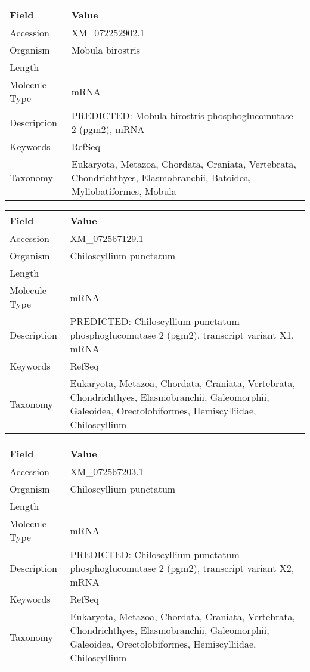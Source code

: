 \documentclass[10pt]{article}
\begin{document}
{\footnotesize
\begin{longtable}{>{\raggedright\arraybackslash}p{4.5cm} >{\raggedright\arraybackslash}p{11.5cm}}
\textbf{Field} & \textbf{Value} \\
\hline
Accession & XM\_072252902.1 \\
Organism & Mobula birostris \\
Length & 4020 \\
Molecule Type & mRNA \\
Description & PREDICTED: Mobula birostris phosphoglucomutase 2 (pgm2), mRNA \\
Keywords & RefSeq \\
Taxonomy & Eukaryota, Metazoa, Chordata, Craniata, Vertebrata, Chondrichthyes, Elasmobranchii, Batoidea, Myliobatiformes, Mobula \\
\end{longtable}
}

{\footnotesize
\begin{longtable}{>{\raggedright\arraybackslash}p{4.5cm} >{\raggedright\arraybackslash}p{11.5cm}}
\textbf{Field} & \textbf{Value} \\
\hline
Accession & XM\_072567129.1 \\
Organism & Chiloscyllium punctatum \\
Length & 2717 \\
Molecule Type & mRNA \\
Description & PREDICTED: Chiloscyllium punctatum phosphoglucomutase 2 (pgm2), transcript variant X1, mRNA \\
Keywords & RefSeq \\
Taxonomy & Eukaryota, Metazoa, Chordata, Craniata, Vertebrata, Chondrichthyes, Elasmobranchii, Galeomorphii, Galeoidea, Orectolobiformes, Hemiscylliidae, Chiloscyllium \\
\end{longtable}
}

{\footnotesize
\begin{longtable}{>{\raggedright\arraybackslash}p{4.5cm} >{\raggedright\arraybackslash}p{11.5cm}}
\textbf{Field} & \textbf{Value} \\
\hline
Accession & XM\_072567203.1 \\
Organism & Chiloscyllium punctatum \\
Length & 2665 \\
Molecule Type & mRNA \\
Description & PREDICTED: Chiloscyllium punctatum phosphoglucomutase 2 (pgm2), transcript variant X2, mRNA \\
Keywords & RefSeq \\
Taxonomy & Eukaryota, Metazoa, Chordata, Craniata, Vertebrata, Chondrichthyes, Elasmobranchii, Galeomorphii, Galeoidea, Orectolobiformes, Hemiscylliidae, Chiloscyllium \\
\end{longtable}
}
\end{document}
